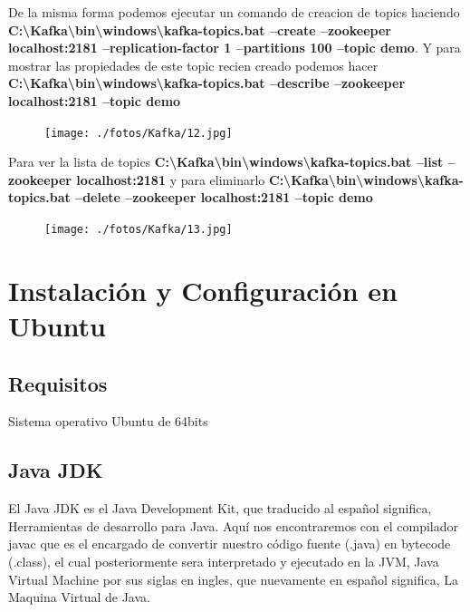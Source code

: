 \documentclass[a4paper,10pt]{article}
\begin{document}
De la misma forma podemos ejecutar un comando de creacion de topics haciendo \textbf{C:\textbackslash Kafka\textbackslash bin\textbackslash windows\textbackslash kafka-topics.bat --create --zookeeper localhost:2181 --replication-factor 1 --partitions 100 --topic demo}. Y para mostrar las propiedades de este topic recien creado podemos hacer \textbf{C:\textbackslash Kafka\textbackslash bin\textbackslash windows\textbackslash kafka-topics.bat --describe --zookeeper localhost:2181 --topic demo}

\begin{figure}[H]
\begin{center}
\texttt{[image: ./fotos/Kafka/12.jpg]}
\end{center}
\end{figure}

Para ver la lista de topics \textbf{C:\textbackslash Kafka\textbackslash bin\textbackslash windows\textbackslash kafka-topics.bat --list --zookeeper localhost:2181} y para eliminarlo \textbf{C:\textbackslash Kafka\textbackslash bin\textbackslash windows\textbackslash kafka-topics.bat --delete --zookeeper localhost:2181 --topic demo}

\begin{figure}[H]
\begin{center}
\texttt{[image: ./fotos/Kafka/13.jpg]}
\end{center}
\end{figure}

\section{Instalación y Configuración en Ubuntu}

\subsection{Requisitos}

Sistema operativo Ubuntu de 64bits

\clearpage

\subsection{Java JDK}

El Java JDK es el Java Development Kit, que traducido al español significa, Herramientas de desarrollo para Java. Aquí nos encontraremos con el compilador javac que es el encargado de convertir nuestro código fuente (.java) en bytecode (.class), el cual posteriormente sera interpretado y ejecutado en la JVM, Java Virtual Machine por sus siglas en ingles, que nuevamente en español significa, La Maquina Virtual de Java. 
\end{document}
